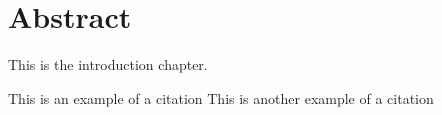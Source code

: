 \chapter{Abstract}

This is the introduction chapter.

This is an example of a citation \cite{bisterInferenceCosmicraySource2022}
This is another example of a citation \cite[Buck]{buckOriginChemicalBimodality2020}

